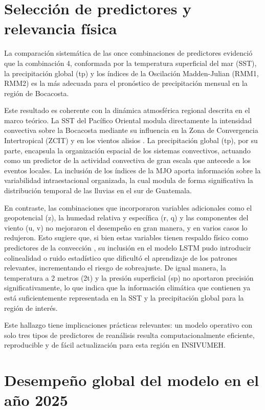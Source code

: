 \section{Selección de predictores y relevancia física}

La comparación sistemática de las once combinaciones de predictores evidenció que la
combinación 4, conformada por la temperatura superficial del mar (SST), la
precipitación global (tp) y los índices de la Oscilación Madden-Julian
(RMM1, RMM2) es la más adecuada para el pronóstico de precipitación
mensual en la región de Bocacosta.

Este resultado es coherente con la dinámica atmosférica regional descrita en el marco
teórico. La SST del Pacífico Oriental modula directamente la intensidad convectiva sobre
la Bocacosta mediante su influencia en la Zona de Convergencia Intertropical (ZCIT) y en
los vientos alisios \cite{dai2000global}. La precipitación global (tp), por su
parte, encapsula la organización espacial de los sistemas convectivos, 
actuando como un predictor de la actividad convectiva de gran
escala que antecede a los eventos locales. La inclusión de los índices de la MJO aporta
información sobre la variabilidad intraestacional organizada, la cual modula de forma
significativa la distribución temporal de las lluvias en el sur de Guatemala.

En contraste, las combinaciones que incorporaron variables adicionales como el
geopotencial (z), la humedad relativa y específica (r, q) y
las componentes del viento (u, v) no mejoraron el desempeño en gran manera, y en
varios casos lo redujeron. Esto sugiere que, si bien estas variables tienen respaldo
físico como predictores de la convección \cite{houze2014cloud}, su inclusión en el modelo
LSTM pudo introducir colinealidad o ruido estadístico que dificultó el aprendizaje de
los patrones relevantes, incrementando el riesgo de sobreajuste. De igual manera, la
temperatura a 2 metros (2t) y la presión superficial (sp) no aportaron precisión
significativamente, lo que indica que la información climática que contienen ya está
suficientemente representada en la SST y la precipitación global para la región de
interés.

Este hallazgo tiene implicaciones prácticas relevantes: un modelo operativo con solo
tres tipos de predictores de reanálisis resulta computacionalmente eficiente,
reproducible y de fácil actualización para esta región en INSIVUMEH.

\section{Desempeño global del modelo en el año 2025}

